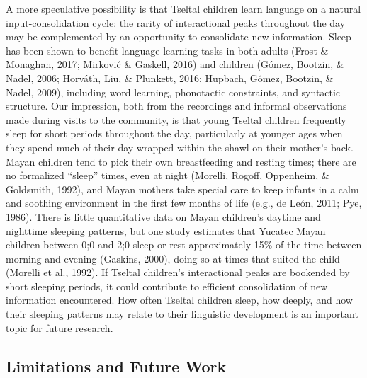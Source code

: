 \documentclass[floatsintext,man]{apa6}
\theoremstyle{definition}
\theoremstyle{definition}
\theoremstyle{definition}
\theoremstyle{remark}
\begin{document}
A more speculative possibility is that Tseltal children learn language
on a natural input-consolidation cycle: the rarity of interactional
peaks throughout the day may be complemented by an opportunity to
consolidate new information. Sleep has been shown to benefit language
learning tasks in both adults (Frost \& Monaghan, 2017; Mirković \&
Gaskell, 2016) and children (Gómez, Bootzin, \& Nadel, 2006; Horváth,
Liu, \& Plunkett, 2016; Hupbach, Gómez, Bootzin, \& Nadel, 2009),
including word learning, phonotactic constraints, and syntactic
structure. Our impression, both from the recordings and informal
observations made during visits to the community, is that young Tseltal
children frequently sleep for short periods throughout the day,
particularly at younger ages when they spend much of their day wrapped
within the shawl on their mother's back. Mayan children tend to pick
their own breastfeeding and resting times; there are no formalized
\enquote{sleep} times, even at night (Morelli, Rogoff, Oppenheim, \&
Goldsmith, 1992), and Mayan mothers take special care to keep infants in
a calm and soothing environment in the first few months of life (e.g.,
de León, 2011; Pye, 1986). There is little quantitative data on Mayan
children's daytime and nighttime sleeping patterns, but one study
estimates that Yucatec Mayan children between 0;0 and 2;0 sleep or rest
approximately 15\% of the time between morning and evening (Gaskins,
2000), doing so at times that suited the child (Morelli et al., 1992).
If Tseltal children's interactional peaks are bookended by short
sleeping periods, it could contribute to efficient consolidation of new
information encountered. How often Tseltal children sleep, how deeply,
and how their sleeping patterns may relate to their linguistic
development is an important topic for future research.

\subsection{Limitations and Future Work}\label{disc-limfut}
\end{document}
